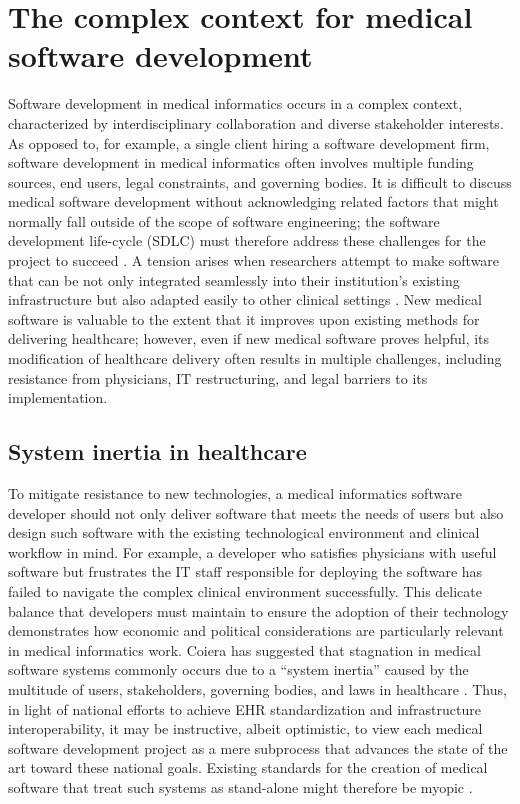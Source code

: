 \documentclass[12pt]{article} %
\begin{document}
\section{The complex context for medical software development}
Software development in medical informatics occurs in a complex context, characterized by interdisciplinary collaboration and diverse stakeholder interests.
As opposed to, for example, a single client hiring a software development firm, software development in medical informatics often involves multiple funding sources, end users, legal constraints, and governing bodies.
It is difficult to discuss medical software development without acknowledging related factors that might normally fall outside of the scope of software engineering; the software development life-cycle (SDLC) must therefore address these challenges for the project to succeed \cite{song2007}.
A tension arises when researchers attempt to make software that can be not only integrated seamlessly into their institution's existing infrastructure but also adapted easily to other clinical settings \cite{weber2013}.
New medical software is valuable to the extent that it improves upon existing methods for delivering healthcare; however, even if new medical software proves helpful, its modification of healthcare delivery often results in multiple challenges, including resistance from physicians, IT restructuring, and legal barriers to its implementation.

\subsection{System inertia in healthcare}
To mitigate resistance to new technologies, a medical informatics software developer should not only deliver software that meets the needs of users but also design such software with the existing technological environment and clinical workflow in mind.
For example, a developer who satisfies physicians with useful software but frustrates the IT staff responsible for deploying the software has failed to navigate the complex clinical environment successfully.
This delicate balance that developers must maintain to ensure the adoption of their technology demonstrates how economic and political considerations are particularly relevant in medical informatics work.
Coiera has suggested that stagnation in medical software systems commonly occurs due to a ``system inertia'' caused by the multitude of users, stakeholders, governing bodies, and laws in healthcare \cite{coiera2011}.
Thus, in light of national efforts to achieve EHR standardization and infrastructure interoperability, it may be instructive, albeit optimistic, to view each medical software development project as a mere subprocess that advances the state of the art toward these national goals.
Existing standards for the creation of medical software that treat such systems as stand-alone might therefore be myopic \cite{kuziemsky2013, larson2012}.
\end{document}
